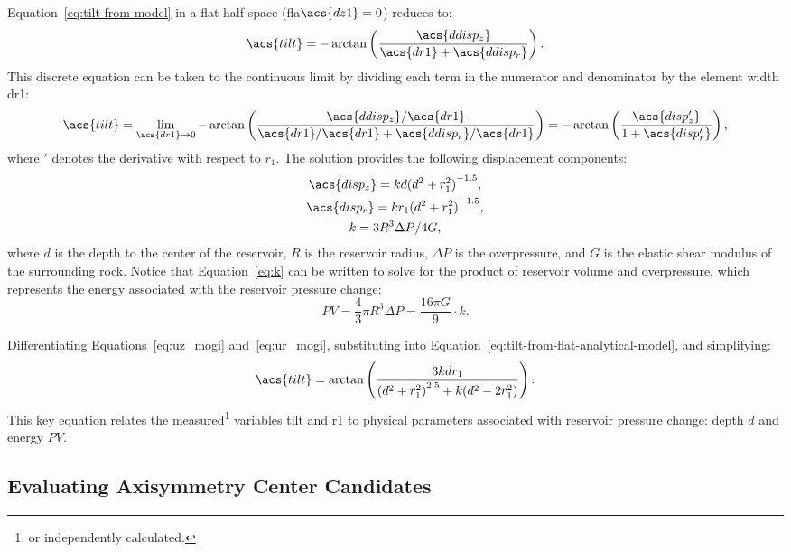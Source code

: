 Equation~\eqref{eq:tilt-from-model} in a flat half-space (fla$\acs{dz1} = 0$) reduces to:
\begin{equation}
    \acs{tilt} = 
    -\arctan\left(\dfrac{\acs{ddisp_z}}{\acs{dr1}+\acs{ddisp_r}}\right).\label{eq:tilt-from-flat-model}
\end{equation}
This discrete equation can be taken to the continuous limit by dividing each term in the numerator and denominator by the element width \acs{dr1}:
\begin{equation}
\acs{tilt}
    = \lim_{\acs{dr1}\to0} 
    -\arctan\left(\dfrac{\acs{ddisp_z}/\acs{dr1}}{\acs{dr1}/\acs{dr1}
    + \acs{ddisp_r}/\acs{dr1}}\right) = 
    -\arctan\left(\dfrac{\acs{disp_z'}}{1+\acs{disp_r'}}\right),\label{eq:tilt-from-flat-analytical-model}
\end{equation}
where $'$ denotes the derivative with respect to $r_1$. The \textcite{mogi_relations_1958} solution provides the following displacement components:
\begin{gather}
    \acs{disp_z} = kd{(d^2+r_1^2)}^{-1.5},\label{eq:uz_mogi}\\
    \acs{disp_r} = kr_1{(d^2+r_1^2)}^{-1.5},\label{eq:ur_mogi}\\
    k = {3R^3\Delta P}/{4G},\label{eq:k}
\end{gather}
where $d$ is the depth to the center of the reservoir, $R$ is the reservoir radius, $\Delta P$ is the overpressure, and $G$ is the elastic shear modulus of the surrounding rock. Notice that Equation~\eqref{eq:k} can be written to solve for the product of reservoir volume and overpressure, which represents the energy associated with the reservoir pressure change:
\begin{equation}
    PV = \frac{4}{3}\pi R^3\Delta P=\frac{16\pi G}{9} \cdot k.
\end{equation}

Differentiating Equations~\eqref{eq:uz_mogi} and~\eqref{eq:ur_mogi}, substituting into Equation~\eqref{eq:tilt-from-flat-analytical-model}, and simplifying:
\begin{equation}
    \acs{tilt} = \arctan\left(\frac{3kdr_1}{{(d^2+r_1^2)}^{2.5}+k(d^2-2r_1^2)}\right).\label{eq:tilt-from-mogi-model}
\end{equation}
This key equation relates the measured\footnote{or independently calculated.} variables \acs{tilt} and r1 to physical parameters associated with reservoir pressure change: depth $d$ and energy $PV$.

\subsection{Evaluating Axisymmetry Center Candidates}

